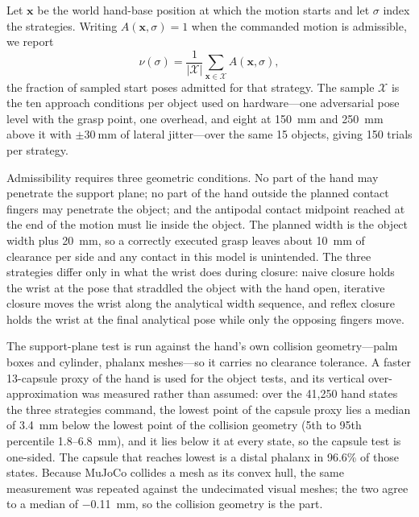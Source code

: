Let $\mathbf{x}$ be the world hand-base position at which the motion starts and
let $\sigma$ index the strategies. Writing $A(\mathbf{x},\sigma)=1$ when the
commanded motion is admissible, we report
\begin{equation}
  \nu(\sigma) = \frac{1}{|\mathcal{X}|}\sum_{\mathbf{x}\in\mathcal{X}} A(\mathbf{x},\sigma),
  \label{eq:admissible_fraction}
\end{equation}
the fraction of sampled start poses admitted for that strategy. The sample
$\mathcal{X}$ is the ten approach conditions per object used on hardware---one
adversarial pose level with the grasp point, one overhead, and eight at
\SI{150}{\milli\metre} and \SI{250}{\milli\metre} above it with
$\pm\SI{30}{\milli\metre}$ of lateral jitter---over the same 15 objects, giving
150 trials per strategy.

Admissibility requires three geometric conditions. No part of the hand may
penetrate the support plane; no part of the hand outside the planned contact
fingers may penetrate the object; and the antipodal contact midpoint reached at
the end of the motion must lie inside the object. The planned width is the
object width plus \SI{20}{\milli\metre}, so a correctly executed grasp leaves
about \SI{10}{\milli\metre} of clearance per side and any contact in this model
is unintended. The three strategies differ only in what the wrist does during
closure: naive closure holds the wrist at the pose that straddled the object with
the hand open, iterative closure moves the wrist along the analytical width
sequence, and reflex closure holds the wrist at the final analytical pose while
only the opposing fingers move.

The support-plane test is run against the hand's own collision geometry---palm
boxes and cylinder, phalanx meshes---so it carries no clearance tolerance. A
faster 13-capsule proxy of the hand is used for the object tests, and its
vertical over-approximation was measured rather than assumed: over the 41{,}250
hand states the three strategies command, the lowest point of the capsule proxy
lies a median of \SI{3.4}{\milli\metre} below the lowest point of the collision
geometry (5th to 95th percentile \SI{1.8}{}--\SI{6.8}{\milli\metre}), and it lies
below it at every state, so the capsule test is one-sided. The capsule that
reaches lowest is a distal phalanx in 96.6\% of those states. Because MuJoCo
collides a mesh as its convex hull, the same measurement was repeated against the
undecimated visual meshes; the two agree to a median of
\SI{-0.11}{\milli\metre}, so the collision geometry is the part.

